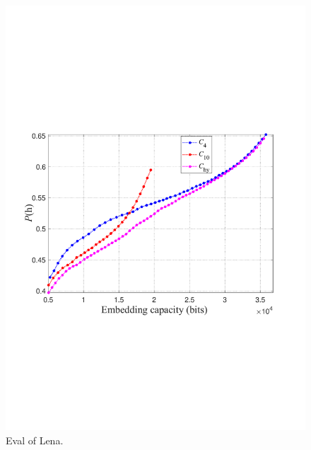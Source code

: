 \documentclass[review,3p,10pt,sort&compress]{elsarticle}
\begin{document}
\begin{figure}
\centering
  \begin{minipage}[t]{0.5\linewidth}
   \centering
   \includegraphics[width=1\textwidth]{figures/PropLenaNoT.pdf}
   \end{minipage}
\centering
\caption{Eval of Lena.}
\label{Fig.Eval0}
\end{figure}
\end{document}
